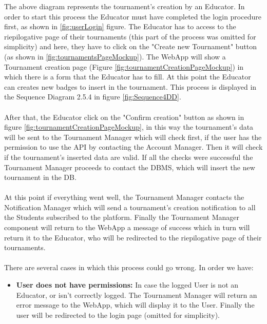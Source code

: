 \documentclass{article}
\begin{document}
{        The above diagram represents the tournament's creation by an Educator.
        In order to start this process the Educator must have completed the login procedure
        first, as shown in \ref{fig:userLogin} figure.
        The Educator has to access to the riepilogative page of their tournaments 
        (this part of the process was omitted for simplicity) and here, they have to click 
        on the "Create new Tournament" button (as shown in \ref{fig:tournamentsPageMockup}).
        The WebApp will show a Tournament creation page (Figure \ref{fig:tournamentCreationPageMockup})
        in which there is a form that the Educator has to fill.
        At this point the Educator can creates new badges to insert in the tournament. This
        process is displayed in the Sequence Diagram 2.5.4 in figure \ref{fig:Sequence4DD}.
        \\ \\
        After that, the Educator click on the "Confirm creation" button as shown in figure 
        \ref{fig:tournamentCreationPageMockup}, in this way the tournament's data will be sent to the
        Tournament Manager which will check first, if the user has the permission to use the API
        by contacting the Account Manager. Then it will check if the tournament's inserted data
        are valid. If all the checks were successful the Tournament Manager proceeds to
        contact the DBMS, which will insert the new tournament in the DB.
        \\ \\
        At this point if everything went well, the Tournament Manager contacts the Notification
        Manager which will send a tournament's creation notification to all the Students
        subscribed to the platform. 
        Finally the Tournament Manager component will return to the WebApp a message of success
        which in turn will return it to the Educator, who will be redirected to the 
        riepilogative page of their tournaments.
        \\ \\
        There are several cases in which this process could go wrong. In order we have:
        \begin{itemize}
            \item \textbf{User does not have permissions:} In case the logged User is not an
            Educator, or isn't correctly logged. The Tournament Manager will return an
            error message to the WebApp, which will display it to the User.
            Finally the user will be redirected to the login page (omitted for simplicity).

\end{itemize}}
\end{document}
